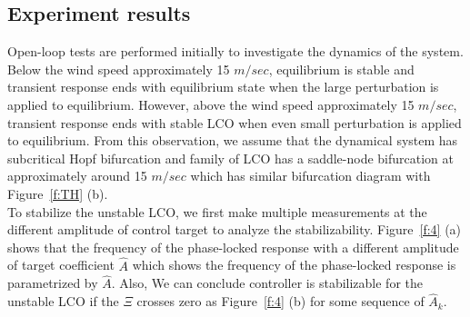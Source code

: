 \documentclass[openacc]{rsproca_new}%
\newcommand{\Fref}[1]{Figure~\ref{#1}}
\begin{document}
\subsection{Experiment results}\label{results}

Open-loop tests are performed initially to investigate the dynamics of the system. Below the wind speed approximately 15 $m/sec$, equilibrium is stable and transient response ends with equilibrium state when the large perturbation is applied to equilibrium. However, above the wind speed approximately 15 $m/sec$, transient response ends with stable LCO when even small perturbation is applied to equilibrium. From this observation, we assume that the dynamical system has subcritical Hopf bifurcation and family of LCO has a saddle-node bifurcation at approximately around 15 $m/sec$ which has similar bifurcation diagram with \Fref{f:TH} (b).\\
To stabilize the unstable LCO, we first make multiple measurements at the different amplitude of control target to analyze the stabilizability. \Fref{f:4} (a) shows that the frequency of the phase-locked response with a different amplitude of target coefficient $\hat A$ which shows the frequency of the phase-locked response is parametrized by $\hat A$. Also, We can conclude controller is stabilizable for the unstable LCO if the $\Xi$ crosses zero as \Fref{f:4} (b) for some sequence of $\hat A_k$.
\end{document}
